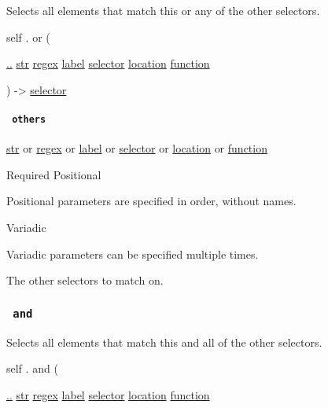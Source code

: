 Selects all elements that match this or any of the other selectors.

self { . } { or } (

{ \hyperref[definitions-or-parameters-others]{..}
\href{/docs/reference/foundations/str/}{str}
\href{/docs/reference/foundations/regex/}{regex}
\href{/docs/reference/foundations/label/}{label}
\href{/docs/reference/foundations/selector/}{selector}
\href{/docs/reference/introspection/location/}{location}
\href{/docs/reference/foundations/function/}{function} }

) -\textgreater{} \href{/docs/reference/foundations/selector/}{selector}

\paragraph{\texorpdfstring{\texttt{\ others\ }}{ others }}\label{definitions-or-others}

\href{/docs/reference/foundations/str/}{str} {or}
\href{/docs/reference/foundations/regex/}{regex} {or}
\href{/docs/reference/foundations/label/}{label} {or}
\href{/docs/reference/foundations/selector/}{selector} {or}
\href{/docs/reference/introspection/location/}{location} {or}
\href{/docs/reference/foundations/function/}{function}

{Required} {{ Positional }}

\label{definitions-or-others-positional-tooltip}
Positional parameters are specified in order, without names.

{{ Variadic }}

\label{definitions-or-others-variadic-tooltip}
Variadic parameters can be specified multiple times.

The other selectors to match on.

\subsubsection{\texorpdfstring{\texttt{\ and\ }}{ and }}\label{definitions-and}

Selects all elements that match this and all of the other selectors.

self { . } { and } (

{ \hyperref[definitions-and-parameters-others]{..}
\href{/docs/reference/foundations/str/}{str}
\href{/docs/reference/foundations/regex/}{regex}
\href{/docs/reference/foundations/label/}{label}
\href{/docs/reference/foundations/selector/}{selector}
\href{/docs/reference/introspection/location/}{location}
\href{/docs/reference/foundations/function/}{function} }

